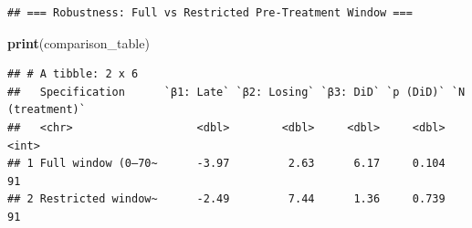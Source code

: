 \documentclass[
]{article}
\newenvironment{Shaded}{\begin{snugshade}}{\end{snugshade}}
\newcommand{\FunctionTok}[1]{\textcolor[rgb]{0.13,0.29,0.53}{\textbf{#1}}}
\newcommand{\NormalTok}[1]{#1}
\begin{document}
\begin{verbatim}
## === Robustness: Full vs Restricted Pre-Treatment Window ===
\end{verbatim}

\begin{Shaded}
\begin{Highlighting}[]
\FunctionTok{print}\NormalTok{(comparison\_table)}
\end{Highlighting}
\end{Shaded}

\begin{verbatim}
## # A tibble: 2 x 6
##   Specification      `β1: Late` `β2: Losing` `β3: DiD` `p (DiD)` `N (treatment)`
##   <chr>                   <dbl>        <dbl>     <dbl>     <dbl>           <int>
## 1 Full window (0–70~      -3.97         2.63      6.17     0.104              91
## 2 Restricted window~      -2.49         7.44      1.36     0.739              91
\end{verbatim}
\end{document}
